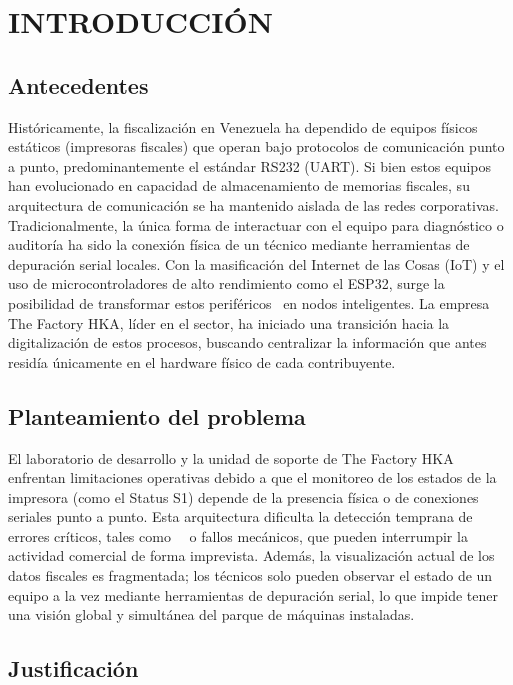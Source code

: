 \chapter*{INTRODUCCIÓN}

\section*{Antecedentes}

Históricamente, la fiscalización en Venezuela ha dependido de equipos físicos estáticos (impresoras fiscales) que operan bajo protocolos de comunicación punto a punto, predominantemente el estándar RS232 (UART). Si bien estos equipos han evolucionado en capacidad de almacenamiento de memorias fiscales, su arquitectura de comunicación se ha mantenido aislada de las redes corporativas. Tradicionalmente, la única forma de interactuar con el equipo para diagnóstico o auditoría ha sido la conexión física de un técnico mediante herramientas de depuración serial locales. Con la masificación del Internet de las Cosas (IoT) y el uso de microcontroladores de alto rendimiento como el ESP32, surge la posibilidad de transformar estos periféricos \ en nodos inteligentes. La empresa The Factory HKA, líder en el sector, ha iniciado una transición hacia la digitalización de estos procesos, buscando centralizar la información que antes residía únicamente en el hardware físico de cada contribuyente.

\section*{Planteamiento del problema}

El laboratorio de desarrollo y la unidad de soporte de The Factory HKA enfrentan limitaciones operativas debido a que el monitoreo de los estados de la impresora (como el Status S1) depende de la presencia física o de conexiones seriales punto a punto. Esta arquitectura dificulta la detección temprana de errores críticos, tales como \, \ o fallos mecánicos, que pueden interrumpir la actividad comercial de forma imprevista. Además, la visualización actual de los datos fiscales es fragmentada; los técnicos solo pueden observar el estado de un equipo a la vez mediante herramientas de depuración serial, lo que impide tener una visión global y simultánea del parque de máquinas instaladas.

\section*{Justificaci\'on}

